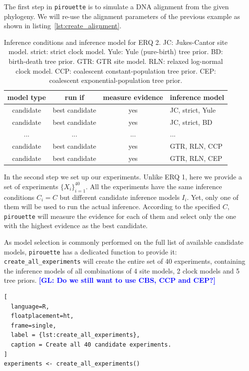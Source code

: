 \documentclass{article}
\newcommand{\giovanni}[1]{\textcolor{blue}{\textbf{[GL: #1]}}}
\begin{document}
The first step in \verb;pirouette; is to simulate a DNA alignment from the 
given phylogeny. 
We will re-use the alignment parameters of the previous example 
as shown in listing~\ref{lst:create_alignment}.

\begin{table}
  \begin{tabular}{ | c | c | c | l | }
    \hline
    \textbf{model type} & \textbf{run if} & \textbf{measure evidence} & 
\textbf{inference model} \\ 
    \hline
    candidate & best candidate & yes & JC, strict, Yule \\
    candidate & best candidate & yes & JC, strict, BD   \\
    ...       & ...            & ... & ...              \\
    candidate & best candidate & yes & GTR, RLN, CCP    \\
    candidate & best candidate & yes & GTR, RLN, CEP    \\
    \hline
  \end{tabular}
  \caption{
    Inference conditions and inference model for ERQ 2.
    JC: Jukes-Cantor site model.
    strict: strict clock model.
    Yule: Yule (pure-birth) tree prior.
    BD: birth-death tree prior.
    GTR: GTR site model.
    RLN: relaxed log-normal clock model.
    CCP: coalescent constant-population tree prior.
    CEP: coalescent exponential-population tree prior.
  }
  \label{tab:RQ2}
\end{table}

In the second step we set up our experiments. Unlike ERQ 1, here we provide a 
set of experiments $\{\mathit{X_{i}}\}_{i=1}^{40}$. All the experiments have 
the same inference conditions $\mathit{C_{i}} = \mathit{C}$ but different 
candidate inference models $\mathit{I_{i}}$. Yet, only one of them will be used 
to run the actual inference. According to the specified $\mathit{C}$, 
\verb;pirouette; will measure the evidence for each of them and select  only 
the one with the highest evidence as the best candidate.

As model selection is commonly performed on the full list of available candidate models,
\verb;pirouette; has a dedicated function to provide it:
\verb;create_all_experiments; will create the entire set of 40 experiments,
containing the inference models of all combinations of 4 site 
models, 2 clock models and 5 tree priors.
\giovanni{Do we still want to use CBS, CCP and CEP?}

\begin{lstlisting}[
  language=R, 
  floatplacement=ht, 
  frame=single, 
  label = {lst:create_all_experiments},
  caption = Create all 40 candidate experiments.
]
experiments <- create_all_experiments()
\end{lstlisting}
\end{document}
